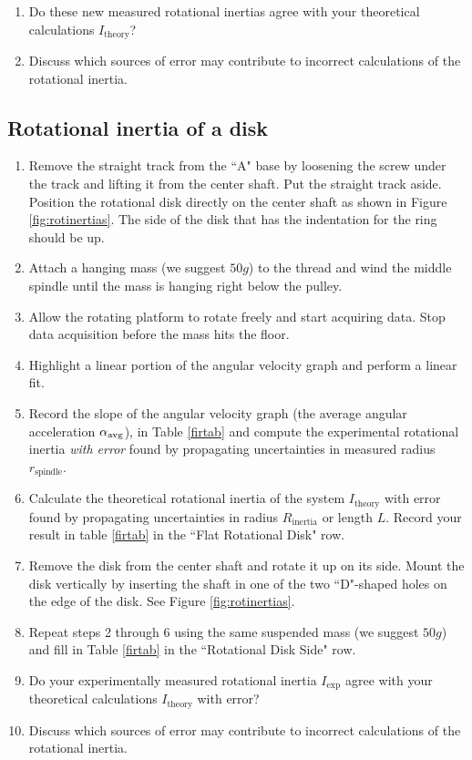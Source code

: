 \begin{enumerate}
\item Do these new measured rotational inertias agree with your theoretical calculations $I_\text{theory}$?
\item Discuss which sources of error may contribute to incorrect calculations of the rotational inertia.
\end{enumerate}

\subsection{Rotational inertia of a disk}

\label{diskinert}
\begin{enumerate}
	\item Remove the straight track from the ``A" base by loosening the screw under the track and lifting it from the center shaft.  Put the straight track aside.  Position the rotational disk directly on the center shaft as shown in Figure \ref{fig:rotinertias}.  The side of the disk that has the indentation for the ring should be up.
	\item Attach a hanging mass (we suggest $50g$) to the thread and wind the middle spindle until the mass is hanging right below the pulley.
	\item Allow the rotating platform to rotate freely and start acquiring data.  Stop data acquisition before the mass hits the floor.
	\item Highlight a linear portion of the angular velocity graph and perform a linear fit.
	\item Record the slope of the angular velocity graph (the average angular acceleration $\alpha _{\rm avg}$), in Table \ref{firtab} and compute the experimental rotational inertia {\it{with error}} found by propagating uncertainties in measured radius $r_\text{spindle}$.
\item Calculate the theoretical rotational inertia of the system $I_\text{theory}$ with error found by propagating uncertainties in radius $R_\text{inertia}$ or length $L$. Record your result in table \ref{firtab} in the ``Flat Rotational Disk" row.
	\item Remove the disk from the center shaft and rotate it up on its side.  Mount the disk vertically by inserting the shaft in one of the two ``D"-shaped holes on the edge of the disk.  See Figure \ref{fig:rotinertias}.
\item Repeat steps 2 through 6 using the same suspended mass (we suggest $50g$) and fill in Table \ref{firtab} in the ``Rotational Disk Side" row.
\item Do your experimentally measured rotational inertia $I_\text{exp}$ agree with your theoretical calculations $I_\text{theory}$ with error?
\item Discuss which sources of error may contribute to incorrect calculations of the rotational inertia.
\end{enumerate}

